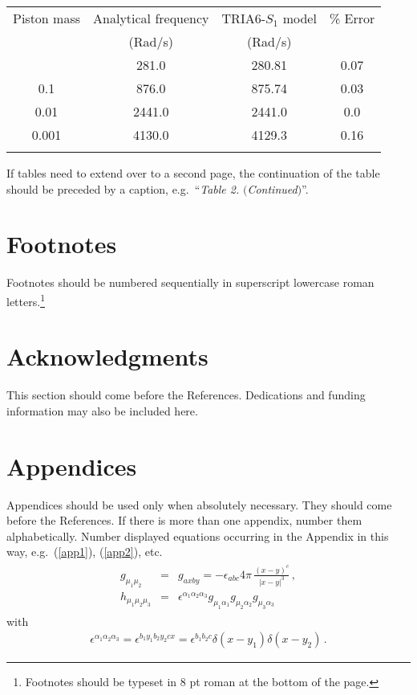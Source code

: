 \documentclass{ws-ijmpcs}
\begin{document}
\begin{table}[ph]
{\begin{tabular}{@{}cccc@{}} \toprule
Piston mass & Analytical frequency & TRIA6-$S_1$ model &
\% Error \\
& (Rad/s) & (Rad/s) \\ \colrule
1.0\hphantom{00} & \hphantom{0}281.0 & \hphantom{0}280.81 & 0.07 \\
0.1\hphantom{00} & \hphantom{0}876.0 & \hphantom{0}875.74 & 0.03 \\
0.01\hphantom{0} & 2441.0 & 2441.0\hphantom{0} & 0.0\hphantom{0} \\
0.001 & 4130.0 & 4129.3\hphantom{0} & 0.16\\ \botrule
\end{tabular} \label{ta1}}
\end{table}

If tables need to extend over to a second page, the continuation of
the table should be preceded by a caption, e.g.~``{\it Table 2.}
$(${\it Continued}$)$''.

\section{Footnotes}

Footnotes should be numbered sequentially in superscript
lowercase roman letters.\footnote{Footnotes should be
typeset in 8 pt roman at the bottom of the page.}

\section*{Acknowledgments}

This section should come before the References. Dedications and funding
information may also be included here.

\appendix

\section{Appendices}

Appendices should be used only when absolutely necessary. They
should come before the References. If there is more than one
appendix, number them alphabetically. Number displayed equations
occurring in the Appendix in this way, e.g.~(\ref{app1}),\break
(\ref{app2}), etc.
\begin{eqnarray}	%
\begin{array}{rcl}
g_{\mu_1\mu_2} &=& g_{axby}=-\displaystyle{\epsilon_{abc}}{4\pi}\,
\frac{(x-y)^c}{|x-y|^3}\,, \\[8pt]
h_{\mu_1\mu_2\mu_3} &=& \epsilon^{\alpha_1 \alpha_2 \alpha_3}
g_{\mu_1\alpha_1}g_{\mu_2\alpha_2}g_{\mu_3\alpha_3}
\end{array}
\label{app1}
\end{eqnarray}
with
\begin{eqnarray}	%
\epsilon^{\alpha_1 \alpha_2 \alpha_3} = \epsilon^{b_1y_1b_2y_2cx} =
\epsilon^{b_1b_2c}\delta(x-y_1)\delta(x-y_2)\,.
\label{app2}
\end{eqnarray}
\end{document}
